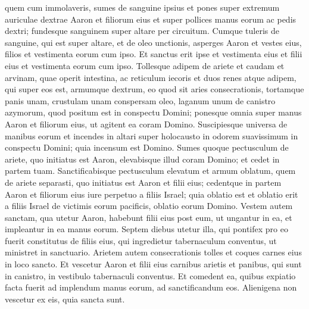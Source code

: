 \begin{biblechapter}
\begin{biblechapter}
\begin{biblechapter}
\begin{biblechapter}
\begin{biblechapter}
\begin{biblechapter}
\begin{biblechapter}
\begin{biblechapter}
\begin{biblechapter}
\begin{biblechapter}
\begin{biblechapter}
\begin{biblechapter}
\begin{biblechapter}
\begin{biblechapter}
\begin{biblechapter}
\begin{biblechapter}
\begin{biblechapter}
\begin{biblechapter}
\begin{biblechapter}
\begin{biblechapter}
\begin{biblechapter}
\begin{biblechapter}
\begin{biblechapter}
\begin{biblechapter}
\begin{biblechapter}
\begin{biblechapter}
\begin{biblechapter}
\begin{biblechapter}
\begin{biblechapter}
\verse quem cum immolaveris, sumes de sanguine ipsius et pones super extremum auriculae dextrae Aaron et filiorum eius et super pollices manus eorum ac pedis dextri; fundesque sanguinem super altare per circuitum. 
\verse Cumque tuleris de sanguine, qui est super altare, et de oleo unctionis, asperges Aaron et vestes eius, filios et vestimenta eorum cum ipso. Et sanctus erit ipse et vestimenta eius et filii eius et vestimenta eorum cum ipso.
 \verse Tollesque adipem de ariete et caudam et arvinam, quae operit intestina, ac reticulum iecoris et duos renes atque adipem, qui super eos est, armumque dextrum, eo quod sit aries consecrationis, 
\verse tortamque panis unam, crustulam unam conspersam oleo, laganum unum de canistro azymorum, quod positum est in conspectu Domini; 
\verse ponesque omnia super manus Aaron et filiorum eius, ut agitent ea coram Domino. 
\verse Suscipiesque universa de manibus eorum et incendes in altari super holocausto in odorem suavissimum in conspectu Domini; quia incensum est Domino. 
\verse Sumes quoque pectusculum de ariete, quo initiatus est Aaron, elevabisque illud coram Domino; et cedet in partem tuam. 
 \verse Sanctificabisque pectusculum elevatum et armum oblatum, quem de ariete separasti, 
\verse quo initiatus est Aaron et filii eius; cedentque in partem Aaron et filiorum eius iure perpetuo a filiis Israel; quia oblatio est et oblatio erit a filiis Israel de victimis eorum pacificis, oblatio eorum Domino.
 \verse Vestem autem sanctam, qua utetur Aaron, habebunt filii eius post eum, ut ungantur in ea, et impleantur in ea manus eorum. 
\verse Septem diebus utetur illa, qui pontifex pro eo fuerit constitutus de filiis eius, qui ingredietur tabernaculum conventus, ut ministret in sanctuario.
 \verse Arietem autem consecrationis tolles et coques carnes eius in loco sancto. 
 \verse Et vescetur Aaron et filii eius carnibus arietis et panibus, qui sunt in canistro, in vestibulo tabernaculi conventus. 
\verse Et comedent ea, quibus expiatio facta fuerit ad implendum manus eorum, ad sanctificandum eos. Alienigena non vescetur ex eis, quia sancta sunt. 

\end{biblechapter}
\end{biblechapter}
\end{biblechapter}
\end{biblechapter}
\end{biblechapter}
\end{biblechapter}
\end{biblechapter}
\end{biblechapter}
\end{biblechapter}
\end{biblechapter}
\end{biblechapter}
\end{biblechapter}
\end{biblechapter}
\end{biblechapter}
\end{biblechapter}
\end{biblechapter}
\end{biblechapter}
\end{biblechapter}
\end{biblechapter}
\end{biblechapter}
\end{biblechapter}
\end{biblechapter}
\end{biblechapter}
\end{biblechapter}
\end{biblechapter}
\end{biblechapter}
\end{biblechapter}
\end{biblechapter}
\end{biblechapter}
